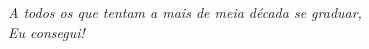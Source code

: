 \begin{dedicatoria}
   \vspace*{\fill}
   \begin{flushright}
   	\textit{A todos os que tentam a mais de meia década se graduar, \\ Eu consegui!}
   	
   \end{flushright}
\end{dedicatoria}
